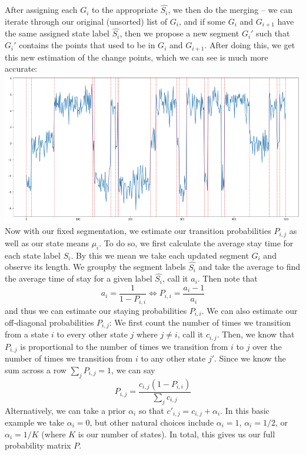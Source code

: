 \documentclass[a4paper]{amsproc}
\theoremstyle{plain}
\theoremstyle{definition}
\theoremstyle{remark}
\numberwithin{equation}{section}
\begin{document}
    After assigning each $G_i$ to the appropriate $\hat{S_i}$, we then do the merging -- we can iterate through our original (unsorted) list of $G_i$, and if some $G_i$ and $G_{i+1}$ have the same assigned state label $\hat{S_i}$, then we propose a new segment $G_i'$ such that $G_i'$ contains the points that used to be in $G_i$ and $G_{i+1}$. After doing this, we get this new estimation of the change points, which we can see is much more accurate:\\
    \includegraphics[scale=0.4]{examplefixedseg.png}\\
    Now with our fixed segmentation, we estimate our transition probabilities $P_{i, j}$ as well as our state means $\mu_i$. To do so, we first calculate the average stay time for each state label $\hat{S_i}$. By this we mean we take each updated segment $G_i$ and observe its length. We groupby the segment labels $\hat{S_i}$ and take the average to find the average time of stay for a given label $\hat{S_i}$, call it $a_i$. Then note that
    \[
    a_i = \frac{1}{1 - P_{i, i}} \iff P_{i, i} = \frac{a_i - 1}{a_i}
    \] 
    and thus we can estimate our staying probabilities $P_{i, i}$. We can also estimate our off-diagonal probabilities $P_{i, j}$: We first count the number of times we transition from a state $i$ to every other state $j$ where $j \neq i$, call it $c_{i, j}$. Then, we know that $P_{i, j}$ is proportional to the number of times we transition from $i$ to $j$ over the number of times we transition from $i$ to any other state $j'$. Since we know the sum across a row $\sum_j P_{i, j} = 1$, we can say
    \[
    P_{i, j} = \frac{c_{i, j}(1 - P_{i, i})}{\sum_j c_{i, j}}
    \]
    Alternatively, we can take a prior $\alpha_i$ so that $c'_{i, j} = c_{i, j} + \alpha_i$. In this basic example we take $\alpha_i = 0$, but other natural choices include $\alpha_i = 1$, $\alpha_i = 1/2$, or $\alpha_i = 1/K$ (where $K$ is our number of states). In total, this gives us our full probability matrix $P$.\\ 
    
\end{document}
